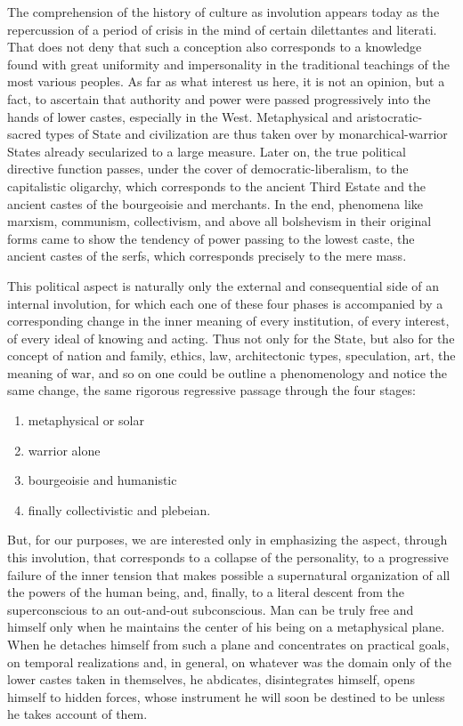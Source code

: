 The comprehension of the history of culture as involution appears today as the repercussion of a period of crisis in the mind of certain dilettantes and literati. That does not deny that such a conception also corresponds to a knowledge found with great uniformity and impersonality in the traditional teachings of the most various peoples. As far as what interest us here, it is not an opinion, but a fact, to ascertain that authority and power were passed progressively into the hands of lower castes, especially in the West. Metaphysical and aristocratic-sacred types of State and civilization are thus taken over by monarchical-warrior States already secularized to a large measure. Later on, the true political directive function passes, under the cover of democratic-liberalism, to the capitalistic oligarchy, which corresponds to the ancient Third Estate and the ancient castes of the bourgeoisie and merchants. In the end, phenomena like marxism, communism, collectivism, and above all bolshevism in their original forms came to show the tendency of power passing to the lowest caste, the ancient castes of the serfs, which corresponds precisely to the mere mass.

This political aspect is naturally only the external and consequential side of an internal involution, for which each one of these four phases is accompanied by a corresponding change in the inner meaning of every institution, of every interest, of every ideal of knowing and acting. Thus not only for the State, but also for the concept of nation and family, ethics, law, architectonic types, speculation, art, the meaning of war, and so on one could be outline a phenomenology and notice the same change, the same rigorous regressive passage through the four stages:

\begin{enumerate}
\item metaphysical or solar 
\item warrior alone 
\item bourgeoisie and humanistic 
\item finally collectivistic and plebeian. 
\end{enumerate}
But, for our purposes, we are interested only in emphasizing the aspect, through this involution, that corresponds to a collapse of the personality, to a progressive failure of the inner tension that makes possible a supernatural organization of all the powers of the human being, and, finally, to a literal descent from the superconscious to an out-and-out subconscious. Man can be truly free and himself only when he maintains the center of his being on a metaphysical plane. When he detaches himself from such a plane and concentrates on practical goals, on temporal realizations and, in general, on whatever was the domain only of the lower castes taken in themselves, he abdicates, disintegrates himself, opens himself to hidden forces, whose instrument he will soon be destined to be unless he takes account of them.

